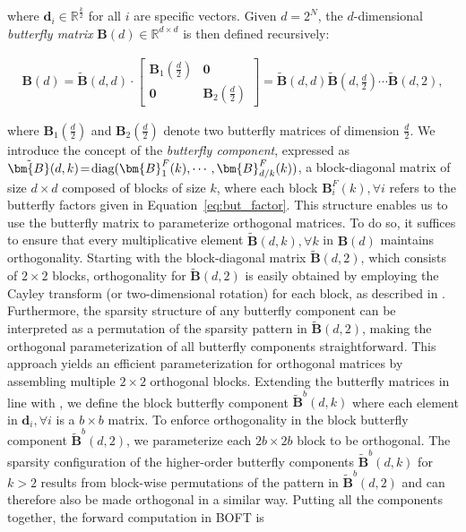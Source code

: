 where $\bm{d}_i\in\mathbb{R}^{\frac{k}{2}}$ for all $i$ are specific vectors. Given $d=2^N$, the $d$-dimensional \emph{butterfly matrix} $\bm{B}(d)\in\mathbb{R}^{d\times d}$ is then defined recursively:

\begin{equation}
\begin{aligned}
    \!\!\bm{B}(d)=\tilde{\bm{B}}(d,d)\!\cdot\!\begin{bmatrix}
    \bm{B}_1(\frac{d}{2})\!\!\!\!\! & \bm{0} \\
    \bm{0}\!\!\!\!\! &\bm{B}_2(\frac{d}{2})
    \end{bmatrix}= \tilde{\bm{B}}(d,d)\tilde{\bm{B}}(d,\frac{d}{2})\cdots\tilde{\bm{B}}(d,2),
\end{aligned}
\end{equation}

where $\bm{B}_1(\frac{d}{2})$ and $\bm{B}_2(\frac{d}{2})$ denote two butterfly matrices of dimension $\frac{d}{2}$. We introduce the concept of the \emph{butterfly component}, expressed as $\thickmuskip=2mu \medmuskip=2mu \tilde{\bm{B}}(d,k)=\text{diag}(\bm{B}^F_1(k),\cdots,\bm{B}^F_{d/k}(k))$, a block-diagonal matrix of size $d\times d$ composed of blocks of size $k$, where each block $\bm{B}^F_i(k),\forall i$ refers to the butterfly factors given in Equation~\ref{eq:but_factor}. This structure enables us to use the butterfly matrix to parameterize orthogonal matrices. To do so, it suffices to ensure that every multiplicative element $\tilde{\bm{B}}(d,k),\forall k$ in $\bm{B}(d)$ maintains orthogonality. Starting with the block-diagonal matrix $\tilde{\bm{B}}(d,2)$, which consists of $2\times 2$ blocks, orthogonality for $\tilde{\bm{B}}(d,2)$ is easily obtained by employing the Cayley transform (or two-dimensional rotation) for each block, as described in \cite{liu2021orthogonal,qiu2023controlling}. Furthermore, the sparsity structure of any butterfly component can be interpreted as a permutation of the sparsity pattern in $\tilde{\bm{B}}(d,2)$, making the orthogonal parameterization of all butterfly components straightforward. This approach yields an efficient parameterization for orthogonal matrices by assembling multiple $2\times 2$ orthogonal blocks. Extending the butterfly matrices in line with \cite{chen2022pixelated}, we define the block butterfly component $\tilde{\bm{B}}^b(d,k)$ where each element in $\bm{d}_i,\forall i$ is a $b\times b$ matrix. To enforce orthogonality in the block butterfly component $\tilde{\bm{B}}^b(d,2)$, we parameterize each $2b\times 2b$ block to be orthogonal. The sparsity configuration of the higher-order butterfly components $\tilde{\bm{B}}^b(d,k)$ for $k>2$ results from block-wise permutations of the pattern in $\tilde{\bm{B}}^b(d,2)$ and can therefore also be made orthogonal in a similar way. Putting all the components together, the forward computation in BOFT is


